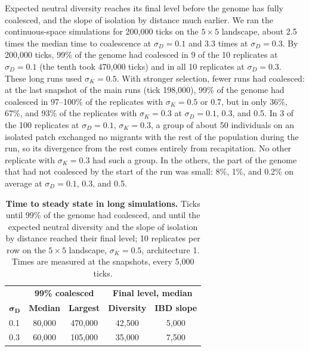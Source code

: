 \documentclass[]{article}
\begin{document}
Expected neutral diversity reaches its final level
before the genome has fully coalesced,
and the slope of isolation by distance much earlier.
We ran the continuous-space simulations for 200,000 ticks
on the $5 \times 5$ landscape,
about 2.5 times the median time to coalescence at $\sigma_D = 0.1$
and 3.3 times at $\sigma_D = 0.3$.
By 200,000 ticks, 99\% of the genome had coalesced
in 9 of the 10 replicates at $\sigma_D = 0.1$
(the tenth took 470,000 ticks)
and in all 10 replicates at $\sigma_D = 0.3$.
These long runs used $\sigma_K = 0.5$.
With stronger selection, fewer runs had coalesced:
at the last snapshot of the main runs (tick 198,000),
99\% of the genome had coalesced in 97--100\% of the replicates
with $\sigma_K = 0.5$ or 0.7,
but in only 36\%, 67\%, and 93\% of the replicates with $\sigma_K = 0.3$
at $\sigma_D = 0.1$, 0.3, and 0.5.
In 3 of the 100 replicates at $\sigma_D = 0.1$, $\sigma_K = 0.3$,
a group of about 50 individuals on an isolated patch
exchanged no migrants with the rest of the population during the run,
so its divergence from the rest comes entirely from recapitation.
No other replicate with $\sigma_K = 0.3$ had such a group.
In the others, the part of the genome that had not coalesced
by the start of the run was small:
8\%, 1\%, and 0.2\% on average at $\sigma_D = 0.1$, 0.3, and 0.5.

\begin{table}[ht]
  \centering
  \caption{\textbf{Time to steady state in long simulations.}
  Ticks until 99\% of the genome had coalesced,
  and until the expected neutral diversity and the slope of
  isolation by distance reached their final level;
  10 replicates per row on the $5 \times 5$ landscape,
  $\sigma_K = 0.5$, architecture 1.
  Times are measured at the snapshots, every 5,000 ticks.}
  \label{tab:burnin}
  \begin{tabular}{@{}lcccc@{}}
  \hline
  & \multicolumn{2}{c}{\textbf{99\% coalesced}} & \multicolumn{2}{c}{\textbf{Final level, median}} \\
  $\boldsymbol{\sigma_D}$ & \textbf{Median} & \textbf{Largest} & \textbf{Diversity} & \textbf{IBD slope} \\
  \hline
  0.1 & 80,000 & 470,000 & 42,500 & 5,000 \\
  0.3 & 60,000 & 105,000 & 35,000 & 7,500 \\
  \hline
  \end{tabular}
\end{table}

\end{document}
